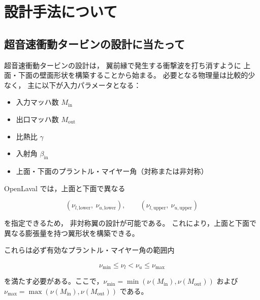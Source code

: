 \chapter{設計手法について}
\begin{abstract}

本ドキュメントは超音速衝動タービン翼の設計手法をまとめたものであり，
NACA および NASA の古典的な衝撃波・膨張波理論に基づく設計法を整理し，
数値的に翼形状を生成するための手順を示す。
本ドキュメントに対応するプログラム OpenLaval は，
上面・下面で異なるプラントル・マイヤー角を指定できる
\textbf{非対称翼（asymmetric blade）} に対応している。

非対称翼では，上面と下面で膨張量が異なるため，
それぞれ別の R$^\ast$，別の衝撃波打ち消し曲線，
別の円弧区間が生成される。
本ドキュメントでは，この非対称設計を含めた最新の設計手順を記述する。

\end{abstract}

\section{超音速衝動タービンの設計に当たって}

超音速衝動タービンの設計は，
翼前縁で発生する衝撃波を打ち消すように
上面・下面の壁面形状を構築することから始まる。
必要となる物理量は比較的少なく，
主に以下が入力パラメータとなる：

\begin{itemize}
  \item 入力マッハ数 $M_{\mathrm{in}}$
  \item 出口マッハ数 $M_{\mathrm{out}}$
  \item 比熱比 $\gamma$
  \item 入射角 $\beta_{\mathrm{in}}$
  \item 上面・下面のプラントル・マイヤー角（対称または非対称）
\end{itemize}

OpenLaval では，上面と下面で異なる


\[
(\nu_{l,\mathrm{lower}},\ \nu_{u,\mathrm{lower}}),\qquad
(\nu_{l,\mathrm{upper}},\ \nu_{u,\mathrm{upper}})
\]


を指定できるため，
非対称翼の設計が可能である。
これにより，上面と下面で異なる膨張量を持つ翼形状を構築できる。

これらは必ず有効なプラントル・マイヤー角の範囲内


\[
\nu_{\min} \le \nu_l < \nu_u \le \nu_{\max}
\]


を満たす必要がある。ここで，$\nu_{\min} = \min(\nu(M_{\mathrm{in}}), \nu(M_{\mathrm{out}}))$ および $\nu_{\max} = \max(\nu(M_{\mathrm{in}}), \nu(M_{\mathrm{out}}))$ である。

